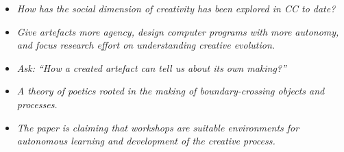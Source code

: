 \documentclass[letterpaper]{article}
\begin{document}
\begin{dialogue}

\begin{mdframed}
\begin{itemize}
\item  \emph{How has the social dimension of creativity has been explored in CC to date?}
\item \emph{Give artefacts more agency, design computer programs with more autonomy, and focus research effort on understanding creative evolution.}
\item \emph{Ask: ``How a created artefact can tell us about its own making?''}
\item \emph{A theory of poetics rooted in the making of boundary-crossing objects and processes.}
\item \emph{The paper is claiming that workshops are suitable environments for autonomous learning and development of the creative process.}
\end{itemize}
\end{mdframed}


\end{dialogue}
\end{document}
